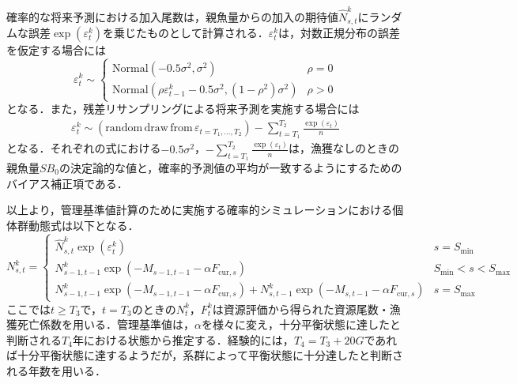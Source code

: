 \documentclass[11pt]{jsarticle}
\begin{document}
確率的な将来予測における加入尾数は，親魚量からの加入の期待値$\hat{N}_{s,t}^k$にランダムな誤差$\exp (\varepsilon_t^k)$を乗じたものとして計算される．$\varepsilon_t^k$は，対数正規分布の誤差を仮定する場合には
\begin{equation}
  \varepsilon_t^k \sim \begin{cases}
    \mathrm{Normal} (-0.5\sigma^2,\sigma^2 ) & \rho=0 \\
    \mathrm{Normal} (\rho \varepsilon_{t-1}^k - 0.5\sigma^2,(1-\rho^2) \sigma^2) & \rho>0
  \end{cases}
  \label{epsilon1}
\end{equation}
となる．また，残差リサンプリングによる将来予測を実施する場合には
\begin{eqnarray}
  \varepsilon_t^k \sim (\mathrm{random} \, \mathrm{draw} \, \mathrm{from} \, \varepsilon_{t={T_1,…,T_2}})-\sum_{t=T_1}^{T_2} \frac{\exp(\varepsilon_t)}{n}
  \label{epsilon2}  
\end{eqnarray}
となる．それぞれの式における$-0.5\sigma^2$，$-\sum_{t=T_1}^{T_2} \frac{\exp(\varepsilon_t)}{n}$は，漁獲なしのときの親魚量$S\!B_0$の決定論的な値と，確率的予測値の平均が一致するようにするためのバイアス補正項である．

以上より，管理基準値計算のために実施する確率的シミュレーションにおける個体群動態式は以下となる．
\begin{equation}
  N_{s,t}^k = \begin{cases}
    \hat{N}_{s,t}^k \exp (\varepsilon_t^k) &     s = S_\mathrm{min} \\    
      N_{s-1, t-1}^k  \exp(-M_{s-1,t-1}-\alpha F_{\mathrm{cur},s} )  &    S_\mathrm{min} < s < S_\mathrm{max} \\
      N_{s-1, t-1}^k  \exp(-M_{s-1,t-1}-\alpha F_{\mathrm{cur},s} ) + N_{s,t-1}^k  \exp(-M_{s,t-1} - \alpha F_{\mathrm{cur},s} ) &   s=S_{\mathrm{max}}
  \end{cases}
  \label{future_eq2}
\end{equation}
ここでは$t \geq T_3$で，$t=T_3$のときの$N_t^k$，$F_t^k$は資源評価から得られた資源尾数・漁獲死亡係数を用いる．管理基準値は，$\alpha$を様々に変え，十分平衡状態に達したと判断される$T_4$年における状態から推定する．経験的には，$T_4=T_3+20G$であれば十分平衡状態に達するようだが，系群によって平衡状態に十分達したと判断される年数を用いる．
\end{document}
